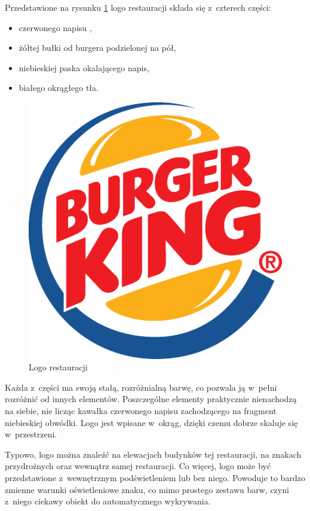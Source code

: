 Przedstawione na rysunku \ref{fig:bklogo} logo restauracji \bk składa się z~czterech części:
\begin{itemize}
    \item czerwonego napisu \bk,
    \item żółtej bułki od burgera podzielonej na pół,
    \item niebieskiej paska okalającego napis,
    \item białego okrągłego tła.
\end{itemize}

\begin{figure}[tb]
    \centering
    \includegraphics[width=0.4\columnwidth]{./figures/bklogo.pdf}
    \caption{Logo restauracji \bk~\cite{WikipediaEN:bklogo}}
    \label{fig:bklogo}
\end{figure}

Każda z~części ma swoją stałą, rozróżnialną barwę, co pozwala ją w~pełni rozróżnić od innych elementów. Poszczególne elementy praktycznie nienachodzą na siebie, nie licząc kawałka czerwonego napisu zachodzącego na fragment niebieskiej obwódki. Logo jest wpisane w~okrąg, dzięki czemu dobrze skaluje się w~przestrzeni.

Typowo, logo \bk można znaleźć na elewacjach budynków tej restauracji, na znakach przydrożnych oraz wewnątrz samej restauracji. Co więcej, logo może być przedstawione z~wewnętrznym podświetleniem lub bez niego. Powoduje to bardzo zmienne warunki oświetleniowe znaku, co mimo prostego zestawu barw, czyni z~niego ciekawy obiekt do automatycznego wykrywania.
